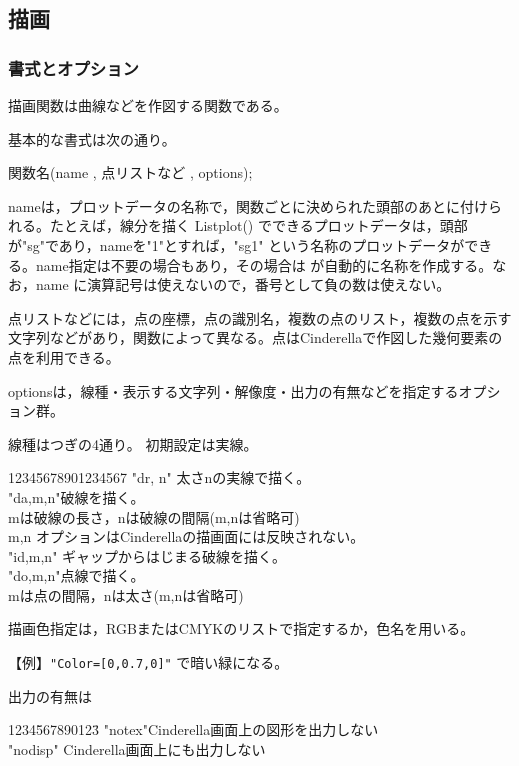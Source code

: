 \documentclass[papersize,a4paper,12pt,uplatex]{jsarticle}
\begin{document}
\subsection{描画}
\subsubsection{書式とオプション}

描画関数は曲線などを作図する関数である。

基本的な書式は次の通り。

\hspace{20mm} 関数名(name , 点リストなど , options);

nameは，プロットデータの名称で，関数ごとに決められた頭部のあとに付けられる。たとえば，線分を描く Listplot() でできるプロットデータは，頭部が"sg"であり，nameを"1"とすれば，"sg1" という名称のプロットデータができる。name指定は不要の場合もあり，その場合は \ketcindy が自動的に名称を作成する。なお，name に演算記号は使えないので，番号として負の数は使えない。

点リストなどには，点の座標，点の識別名，複数の点のリスト，複数の点を示す文字列などがあり，関数によって異なる。点はCinderellaで作図した幾何要素の点を利用できる。

optionsは，線種・表示する文字列・解像度・出力の有無などを指定するオプション群。

 線種はつぎの4通り。 初期設定は実線。

\begin{tabbing}
1234\=5678901234567\=\kill
\>"dr, n" \>太さnの実線で描く。\\
\>"da,m,n"\>破線を描く。\\
\>\> mは破線の長さ，nは破線の間隔(m,nは省略可)\\
\> \>m,n オプションはCinderellaの描画面には反映されない。\\
\>"id,m,n" \>ギャップからはじまる破線を描く。\\
\>"do,m,n"\>点線で描く。\\
\>\>mは点の間隔，nは太さ(m,nは省略可)
\end{tabbing}

描画色指定は，RGBまたはCMYKのリストで指定するか，色名を用いる。

\hspace{10mm}【例】\verb|"Color=[0,0.7,0]"| で暗い緑になる。

出力の有無は
\begin{tabbing}
1234\=567890123\=\kill
 \>"notex"\>Cinderella画面上の図形を出力しない\\
 \>"nodisp" \>Cinderella画面上にも出力しない
 \end{tabbing}
 
\end{document}
